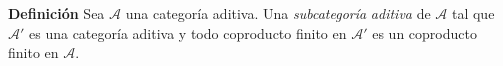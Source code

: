 \documentclass[preview]{standalone}
\begin{document}
\begin{center}
\justifying \textbf{Definición} Sea $\mathscr{A}$ una categoría aditiva. Una \emph{subcategoría} \emph{aditiva} de $\mathscr{A}$ tal que $\mathscr{A}'$ es una categoría aditiva y todo coproducto finito en $\mathscr{A}'$ es un coproducto finito en $\mathscr{A}$.
\end{center}
\end{document}
